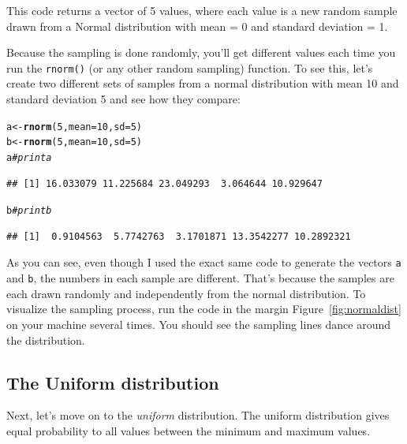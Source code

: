 \documentclass{tufte-book}\usepackage[]{graphicx}\usepackage[]{color}
\makeatletter
\newcommand{\hlnum}[1]{\textcolor[rgb]{0.686,0.059,0.569}{#1}}%
\newcommand{\hlcom}[1]{\textcolor[rgb]{0.678,0.584,0.686}{\textit{#1}}}%
\newcommand{\hlstd}[1]{\textcolor[rgb]{0.345,0.345,0.345}{#1}}%
\newcommand{\hlkwb}[1]{\textcolor[rgb]{0.69,0.353,0.396}{#1}}%
\newcommand{\hlkwc}[1]{\textcolor[rgb]{0.333,0.667,0.333}{#1}}%
\newcommand{\hlkwd}[1]{\textcolor[rgb]{0.737,0.353,0.396}{\textbf{#1}}}%
\newenvironment{kframe}{%
 \def\at@end@of@kframe{}%
 \ifinner\ifhmode%
  \def\at@end@of@kframe{\end{minipage}}%
  \begin{minipage}{\columnwidth}%
 \fi\fi%
 \def\FrameCommand##1{\hskip\@totalleftmargin \hskip-\fboxsep
 \colorbox{shadecolor}{##1}\hskip-\fboxsep
     \hskip-\linewidth \hskip-\@totalleftmargin \hskip\columnwidth}%
 \MakeFramed {\advance\hsize-\width
   \@totalleftmargin\z@ \linewidth\hsize
   \@setminipage}}%
 {\par\unskip\endMakeFramed%
 \at@end@of@kframe}
\newenvironment{knitrout}{}{} %
\makeatother
\begin{document}
This code returns a vector of 5 values, where each value is a new random sample drawn from a Normal distribution with mean = 0 and standard deviation = 1.

Because the sampling is done randomly, you'll get different values each time you run the \texttt{rnorm()} (or any other random sampling) function. To see this, let's create two different sets of samples from a normal distribution with mean 10 and standard deviation 5 and see how they compare:

\begin{knitrout}
\color{fgcolor}\begin{kframe}
\begin{alltt}
\hlstd{a} \hlkwb{<-} \hlkwd{rnorm}\hlstd{(}\hlnum{5}\hlstd{,} \hlkwc{mean} \hlstd{=} \hlnum{10}\hlstd{,} \hlkwc{sd} \hlstd{=} \hlnum{5}\hlstd{)}
\hlstd{b} \hlkwb{<-} \hlkwd{rnorm}\hlstd{(}\hlnum{5}\hlstd{,} \hlkwc{mean} \hlstd{=} \hlnum{10}\hlstd{,} \hlkwc{sd} \hlstd{=} \hlnum{5}\hlstd{)}
\hlstd{a} \hlcom{# print a}
\end{alltt}
\begin{verbatim}
## [1] 16.033079 11.225684 23.049293  3.064644 10.929647
\end{verbatim}
\begin{alltt}
\hlstd{b} \hlcom{# print b}
\end{alltt}
\begin{verbatim}
## [1]  0.9104563  5.7742763  3.1701871 13.3542277 10.2892321
\end{verbatim}
\end{kframe}
\end{knitrout}


As you can see, even though I used the exact same code to generate the vectors \texttt{a} and \texttt{b}, the numbers in each sample are different. That's because the samples are each drawn randomly and independently from the normal distribution. To visualize the sampling process, run the code in the margin Figure~\ref{fig:normaldist} on your machine several times. You should see the sampling lines dance around the distribution. 

\subsection{The Uniform distribution}

Next, let's move on to the \textit{uniform} distribution. The uniform distribution gives equal probability to all values between the minimum and maximum values.
\end{document}
